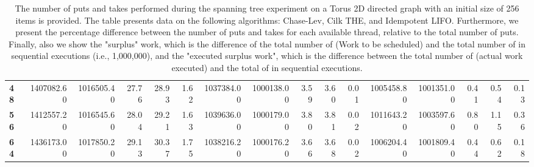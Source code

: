 \begin{table}[!ht]
{\begin{tabular}{lrrrrrrrrrrrrrrr}
\textbf{48} & 1407082.60 & 1016505.40 &          27.76 &       28.93 &                 1.62 & 1037384.00 & 1000138.00 &           3.59 &        3.60 &                 0.01 &      1005458.80 & 1001351.00 &           0.41 &        0.54 &                 0.13 \\
\textbf{56} & 1412557.20 & 1016545.60 &          28.04 &       29.21 &                 1.63 & 1039636.00 & 1000179.00 &           3.80 &        3.81 &                 0.02 &      1011643.20 & 1003597.60 &           0.80 &        1.15 &                 0.36 \\
\textbf{64} & 1436173.00 & 1017850.20 &          29.13 &       30.37 &                 1.75 & 1038216.20 & 1000176.20 &           3.66 &        3.68 &                 0.02 &      1006204.40 & 1001809.40 &           0.44 &        0.62 &                 0.18 \\
\bottomrule
\end{tabular}}
\label{difference-Torus_2D_directed-256-CHASELEV-CILK-IDEMPOTENT_LIFO}
\caption{The number of puts and takes performed during the
    spanning tree experiment on a Torus 2D directed graph with an initial size
    of 256 items is provided. The table presents data on the
    following algorithms: Chase-Lev, Cilk THE, and
    Idempotent LIFO. Furthermore, we present the percentage difference
    between the number of puts and takes for each available thread,
    relative to the total number of puts. Finally, also we show the
    "surplus" work, which is the difference of the total number of
    \Puts (Work to be scheduled) and the total number of \Puts in
    sequential executions (i.e., 1,000,000), and the "executed surplus
    work", which is the difference between the total number of \Takes
    (actual work executed) and the total of \Takes in sequential
    executions.}
\end{table}
